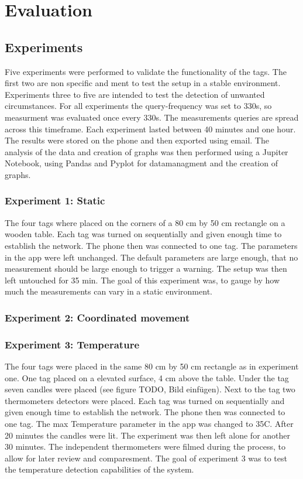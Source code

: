 \chapter{Evaluation}
\label{chap:evaluation}



\section{Experiments}
\label{s:Experiments}
Five experiments were performed to validate the functionality of the tags.
The first two are non specific and ment to test the setup in a stable environment.
Experiments three to five are intended to test the detection of unwanted circumstances.
For all experiments the query-frequency was set to 330s, so measurment was evaluated once every 330s.
The measurements queries are spread across this timeframe.
Each experiment lasted between 40 minutes and one hour.
The results were stored on the phone and then exported using email.
The analysis of the data and creation of graphs was then performed using a Jupiter Notebook, using Pandas and Pyplot for datamanagment and the creation of graphs.



\subsection{Experiment 1: Static}
\label{ss:exp_1}
The four tags where placed on the corners of a 80 cm by 50 cm rectangle on a wooden table.
Each tag was turned on sequentially and given enough time to establish the network.
The phone then was connected to one tag.
The parameters in the app were left unchanged.
The default parameters are large enough, that no measurement should be large enough to trigger a warning.
The setup was then left untouched for 35 min.
The goal of this experiment was, to gauge by how much the measurements can vary in a static environment.


\subsection{Experiment 2: Coordinated movement}
\label{ss:exp_2}

\subsection{Experiment 3: Temperature}
\label{ss:exp_3}
The four tags were placed in the same 80 cm by 50 cm rectangle as in experiment one.
One tag placed on a elevated surface, 4 cm above the table.
Under the tag seven candles were placed (see figure TODO, Bild einfügen).
Next to the tag two thermometers detectors were placed.
Each tag was turned on sequentially and given enough time to establish the network.
The phone then was connected to one tag.
The max Temperature parameter in the app was changed to 35\degree C.
After 20 minutes the candles were lit.
The experiment was then left alone for another 30 minutes.
The independent thermometers were filmed during the process, to allow for later review and comparesment.
The goal of experiment 3 was to test the temperature detection capabilities of the system.


